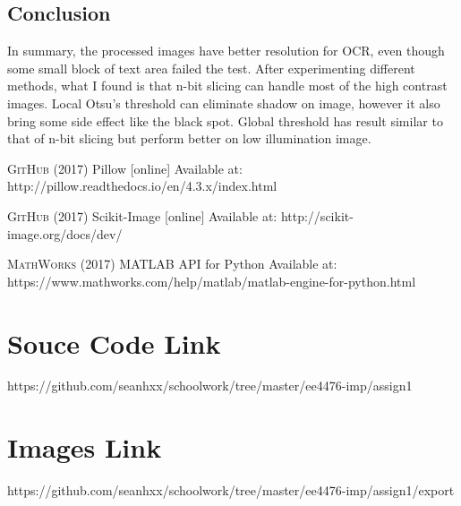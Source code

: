 \documentclass[titlepage]{article}
\begin{document}
\section{Conclusion}
\label{sec:org2a8659b}
In summary, the processed images have better resolution for OCR, even though
some small block of text area failed the test. After experimenting different
methods, what I found is that n-bit slicing can handle most of the high
contrast images. Local Otsu's threshold can eliminate shadow on image, however
it also bring some side effect like the black spot. Global threshold has
result similar to that of n-bit slicing but perform better on low illumination
image.



\begin{thebibliography}{5}

\textsc{GitHub} (2017) Pillow [online] Available at: http://pillow.readthedocs.io/en/4.3.x/index.html

\textsc{GitHub} (2017) Scikit-Image [online] Available at: http://scikit-image.org/docs/dev/

\textsc{MathWorks} (2017) MATLAB API for Python
\newline
[online] Available at: https://www.mathworks.com/help/matlab/matlab-engine-for-python.html 

\end{thebibliography}


\begin{appendices}

\chapter{Souce Code Link}
https://github.com/seanhxx/schoolwork/tree/master/ee4476-imp/assign1

\chapter{Images Link}
https://github.com/seanhxx/schoolwork/tree/master/ee4476-imp/assign1/export

\end{appendices}
\end{document}
